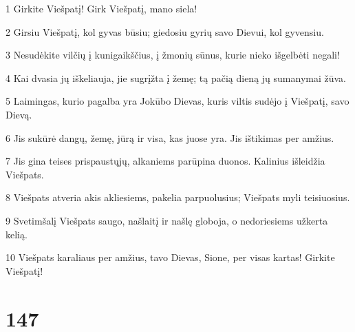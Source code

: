 \par 1 Girkite Viešpatį! Girk Viešpatį, mano siela! 
\par 2 Girsiu Viešpatį, kol gyvas būsiu; giedosiu gyrių savo Dievui, kol gyvensiu. 
\par 3 Nesudėkite vilčių į kunigaikščius, į žmonių sūnus, kurie nieko išgelbėti negali! 
\par 4 Kai dvasia jų iškeliauja, jie sugrįžta į žemę; tą pačią dieną jų sumanymai žūva. 
\par 5 Laimingas, kurio pagalba yra Jokūbo Dievas, kuris viltis sudėjo į Viešpatį, savo Dievą. 
\par 6 Jis sukūrė dangų, žemę, jūrą ir visa, kas juose yra. Jis ištikimas per amžius. 
\par 7 Jis gina teises prispaustųjų, alkaniems parūpina duonos. Kalinius išleidžia Viešpats. 
\par 8 Viešpats atveria akis akliesiems, pakelia parpuolusius; Viešpats myli teisiuosius. 
\par 9 Svetimšalį Viešpats saugo, našlaitį ir našlę globoja, o nedoriesiems užkerta kelią. 
\par 10 Viešpats karaliaus per amžius, tavo Dievas, Sione, per visas kartas! Girkite Viešpatį!


\chapter{147}


